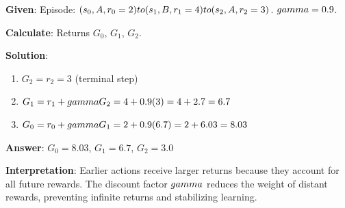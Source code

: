 \documentclass[11pt,a4paper]{article}
\begin{document}
\begin{tcolorbox}[colback=green!5!white,colframe=green!75!black,title=\textbf{Worked Example 17: REINFORCE with Discounting}]
\textbf{Given}: Episode: $(s_0, A, r_0=2) \\to (s_1, B, r_1=4) \\to (s_2, A, r_2=3)$. $\\gamma = 0.9$.

\textbf{Calculate}: Returns $G_0$, $G_1$, $G_2$.

\textbf{Solution}:
\begin{enumerate}
    \item $G_2 = r_2 = 3$ (terminal step)
    \item $G_1 = r_1 + \\gamma G_2 = 4 + 0.9(3) = 4 + 2.7 = 6.7$
    \item $G_0 = r_0 + \\gamma G_1 = 2 + 0.9(6.7) = 2 + 6.03 = 8.03$
\end{enumerate}

\textbf{Answer}: $G_0 = 8.03$, $G_1 = 6.7$, $G_2 = 3.0$

\textbf{Interpretation}: Earlier actions receive larger returns because they account for all future rewards. The discount factor $\\gamma$ reduces the weight of distant rewards, preventing infinite returns and stabilizing learning.
\end{tcolorbox}
\end{document}
